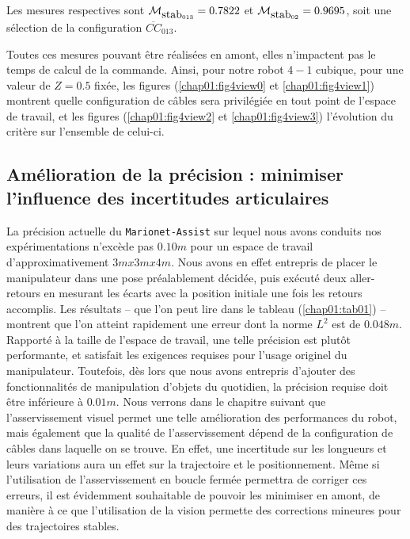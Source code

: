 Les mesures respectives sont $\mathcal M_{\hbox {stab}_{013}} = 0.7822$ et 
$\mathcal M_{\hbox {stab}_{02}} = 0.9695$, soit une sélection de la 
configuration $\overline{CC}_{013}$.

Toutes ces mesures pouvant être réalisées en amont, elles n'impactent pas le 
temps de calcul de la commande. Ainsi, pour notre robot $4-1$ cubique, pour une 
valeur de $Z = 0.5$ fixée, les figures (\ref{chap01:fig4view0} et
\ref{chap01:fig4view1}) montrent quelle configuration de câbles sera 
privilégiée en tout point de l'espace de travail, et  les figures 
(\ref{chap01:fig4view2} et \ref{chap01:fig4view3}) l'évolution du critère sur 
l'ensemble de celui-ci.

\subsection{Am\'elioration de la pr\'ecision : minimiser l'influence des 
incertitudes articulaires}

La pr\'ecision actuelle du {\tt Marionet-Assist} sur lequel nous avons 
conduits nos exp\'erimentations n'exc\`ede pas $0.10m$ pour 
un espace de travail d'approximati\-vement $3mx3mx4m$. Nous avons en effet 
entrepris de placer le manipulateur dans une pose pr\'ealablement d\'ecid\'ee, 
puis ex\'ecut\'e deux aller-retours en mesurant les \'ecarts avec la position 
initiale une fois les retours accomplis. Les r\'esultats -- que l'on peut lire 
dans le tableau (\ref{chap01:tab01}) -- montrent que l'on atteint rapidement 
une 
erreur dont la norme $L^2$ est de $0.048m$. Rapport\'e \`a la taille de 
l'espace de travail, une telle pr\'ecision est plut\^ot performante, et 
satisfait les exigences requises pour l'usage originel du manipulateur. 
Toutefois, d\`es lors que nous avons entrepris d'ajouter des fonctionnalit\'es 
de manipulation d'objets du quotidien, la pr\'ecision requise doit \^etre 
inf\'erieure \`a $0.01m$. Nous verrons dans le chapitre suivant que 
l'asservissement visuel permet une telle am\'elioration des performances du 
robot, mais \'egalement que la qualit\'e de l'asservissement d\'epend de la 
configuration de c\^ables dans laquelle on se trouve. En effet, une incertitude 
sur les longueurs et leurs variations aura un effet sur la trajectoire et le 
positionnement. M\^eme si l'utilisation de l'asservissement en boucle 
ferm\'ee permettra de corriger ces erreurs, il est \'evidemment souhaitable de 
pouvoir les minimiser en amont, de mani\`ere \`a ce que l'utilisation de la 
vision permette des corrections mineures pour des trajectoires stables.  


